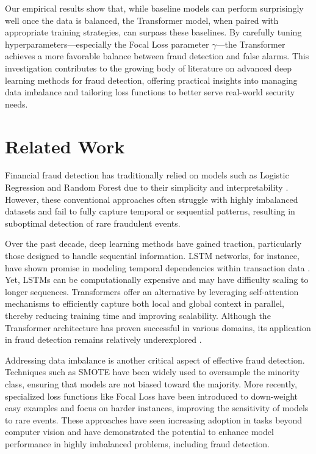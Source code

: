 \documentclass[11pt, oneside]{article}   	%
\begin{document}
Our empirical results show that, while baseline models can perform surprisingly well once the data is balanced, the Transformer model, when paired with appropriate training strategies, can surpass these baselines. By carefully tuning hyperparameters—especially the Focal Loss parameter \(\gamma\)—the Transformer achieves a more favorable balance between fraud detection and false alarms. This investigation contributes to the growing body of literature on advanced deep learning methods for fraud detection, offering practical insights into managing data imbalance and tailoring loss functions to better serve real-world security needs.


\section{Related Work}

Financial fraud detection has traditionally relied on models such as Logistic Regression and Random Forest due to their simplicity and interpretability \cite{ali2022financial}. However, these conventional approaches often struggle with highly imbalanced datasets and fail to fully capture temporal or sequential patterns, resulting in suboptimal detection of rare fraudulent events.

Over the past decade, deep learning methods have gained traction, particularly those designed to handle sequential information. LSTM networks, for instance, have shown promise in modeling temporal dependencies within transaction data \cite{alghofaili2020financial}. Yet, LSTMs can be computationally expensive and may have difficulty scaling to longer sequences. Transformers \cite{NIPS2017_3f5ee243, vaswani2017attention} offer an alternative by leveraging self-attention mechanisms to efficiently capture both local and global context in parallel, thereby reducing training time and improving scalability. Although the Transformer architecture has proven successful in various domains, its application in fraud detection remains relatively underexplored \cite{wang2023financial}.

Addressing data imbalance is another critical aspect of effective fraud detection. Techniques such as SMOTE \cite{chawla2002smote} have been widely used to oversample the minority class, ensuring that models are not biased toward the majority. More recently, specialized loss functions like Focal Loss \cite{lin2017focal} have been introduced to down-weight easy examples and focus on harder instances, improving the sensitivity of models to rare events. These approaches have seen increasing adoption in tasks beyond computer vision and have demonstrated the potential to enhance model performance in highly imbalanced problems, including fraud detection.
\end{document}
